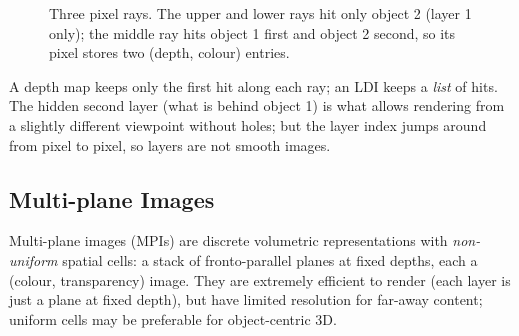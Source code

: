 \documentclass[11pt,a4paper]{article}
\theoremstyle{definition}
\theoremstyle{plain}
\theoremstyle{remark}
\begin{document}
\begin{figure}[ht]
\centering
{}
\caption{Three pixel rays. The upper and lower rays hit only object 2 (layer 1 only); the middle ray hits object 1 first and object 2 second, so its pixel stores two (depth, colour) entries.}
\end{figure}

\begin{intuition}
A depth map keeps only the first hit along each ray; an LDI keeps a \emph{list} of hits. The hidden second layer (what is behind object 1) is what allows rendering from a slightly different viewpoint without holes; but the layer index jumps around from pixel to pixel, so layers are not smooth images.
\end{intuition}

\subsection{Multi-plane Images }
Multi-plane images (MPIs) are discrete volumetric representations with \emph{non-uniform} spatial cells: a stack of fronto-parallel planes at fixed depths, each a (colour, transparency) image. They are extremely efficient to render (each layer is just a plane at fixed depth), but have limited resolution for far-away content; uniform cells may be preferable for object-centric 3D.
\end{document}
